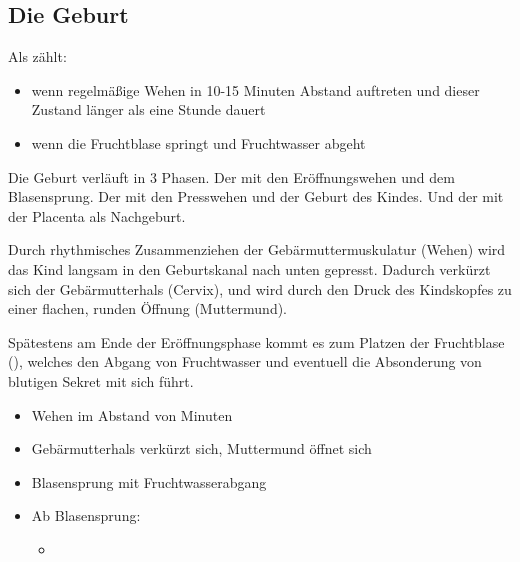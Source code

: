 \subsection{Die Geburt}
\label{topic:geburt}

Als  zählt:
\begin{itemize}
  \item wenn regelmäßige Wehen in 10-15 Minuten Abstand auftreten und dieser
  Zustand länger als eine Stunde dauert \item wenn die Fruchtblase springt und
  Fruchtwasser abgeht
\end{itemize}

Die Geburt verläuft in 3 Phasen. Der 
mit den Eröffnungswehen und dem Blasensprung. Der
 mit den Presswehen und der Geburt
des Kindes. Und der  mit der Placenta als
Nachgeburt.


{
Durch rhythmisches Zusammenziehen der Gebärmuttermuskulatur (Wehen) wird das Kind
langsam in den Geburtskanal nach unten gepresst. Dadurch verkürzt sich der
Gebärmutterhals (Cervix), und wird durch den Druck des Kindskopfes zu einer
flachen, runden Öffnung (Muttermund). 

Spätestens am Ende der Eröffnungsphase
kommt es zum Platzen der Fruchtblase (),
welches den Abgang von Fruchtwasser und eventuell die Absonderung von blutigen Sekret mit sich führt. 

}{
\begin{itemize}
  \item Wehen im Abstand von  Minuten
  \item Gebärmutterhals verkürzt sich, Muttermund öffnet sich
  \item Blasensprung mit Fruchtwasserabgang
  \item Ab Blasensprung: 
  \begin{itemize}
    \item {}
  \end{itemize}
\end{itemize}
}{}{}{}

